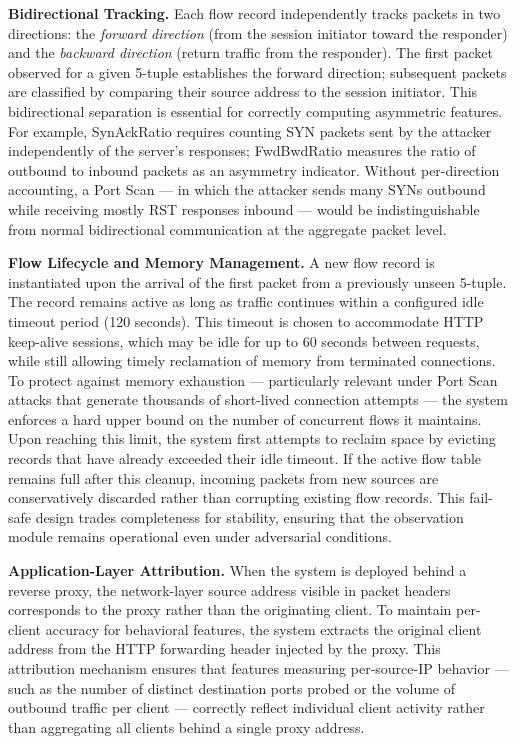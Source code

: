\documentclass[12pt,a4paper]{report}
\begin{document}
\textbf{Bidirectional Tracking.} Each flow record independently tracks packets in two directions: the \textit{forward direction} (from the session initiator toward the responder) and the \textit{backward direction} (return traffic from the responder). The first packet observed for a given 5-tuple establishes the forward direction; subsequent packets are classified by comparing their source address to the session initiator. This bidirectional separation is essential for correctly computing asymmetric features. For example, SynAckRatio requires counting SYN packets sent by the attacker independently of the server's responses; FwdBwdRatio measures the ratio of outbound to inbound packets as an asymmetry indicator. Without per-direction accounting, a Port Scan --- in which the attacker sends many SYNs outbound while receiving mostly RST responses inbound --- would be indistinguishable from normal bidirectional communication at the aggregate packet level.

\textbf{Flow Lifecycle and Memory Management.} A new flow record is instantiated upon the arrival of the first packet from a previously unseen 5-tuple. The record remains active as long as traffic continues within a configured idle timeout period (120 seconds). This timeout is chosen to accommodate HTTP keep-alive sessions, which may be idle for up to 60 seconds between requests, while still allowing timely reclamation of memory from terminated connections. To protect against memory exhaustion --- particularly relevant under Port Scan attacks that generate thousands of short-lived connection attempts --- the system enforces a hard upper bound on the number of concurrent flows it maintains. Upon reaching this limit, the system first attempts to reclaim space by evicting records that have already exceeded their idle timeout. If the active flow table remains full after this cleanup, incoming packets from new sources are conservatively discarded rather than corrupting existing flow records. This fail-safe design trades completeness for stability, ensuring that the observation module remains operational even under adversarial conditions.

\textbf{Application-Layer Attribution.} When the system is deployed behind a reverse proxy, the network-layer source address visible in packet headers corresponds to the proxy rather than the originating client. To maintain per-client accuracy for behavioral features, the system extracts the original client address from the HTTP forwarding header injected by the proxy. This attribution mechanism ensures that features measuring per-source-IP behavior --- such as the number of distinct destination ports probed or the volume of outbound traffic per client --- correctly reflect individual client activity rather than aggregating all clients behind a single proxy address.
\end{document}
